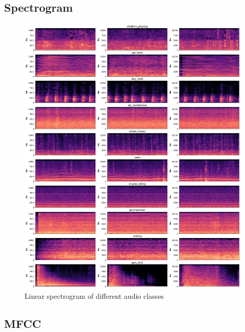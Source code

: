 \subsection{Spectrogram}

\begin{figure}[H]
    \centering
	\includegraphics[width=.9\textwidth]{./images/features/spec-lin}
    \caption{Linear spectrogram of different audio classes}
    \label{fig:spec}
\end{figure}


\subsection{MFCC}


